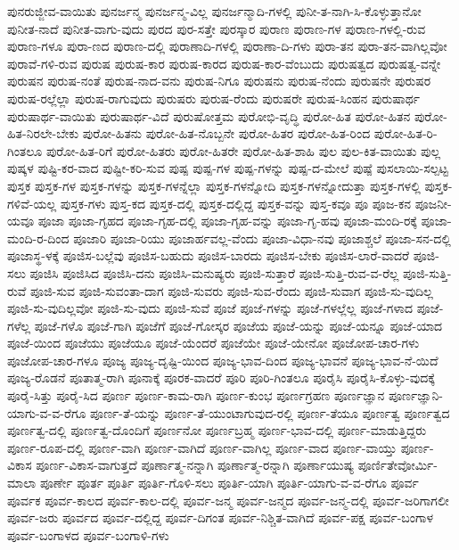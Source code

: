 {ಪುನರುಜ್ಜೀವ-ವಾಯಿತು
ಪುನರ್ಜನ್ಮ
ಪುನರ್ಜನ್ಮ-ವಿಲ್ಲ
ಪುನರ್ಜನ್ಮಾದಿ-ಗಳಲ್ಲಿ
ಪುನೀ-ತ-ನಾಗಿ-ಸಿ-ಕೊಳ್ಳುತ್ತಾನೋ
ಪುನೀತ-ನಾದೆ
ಪುನೀತ-ವಾಗು-ವುದು
ಪುರದ
ಪುರ-ಸತ್ತೇ
ಪುರಸ್ಕಾರ
ಪುರಾಣ
ಪುರಾಣ-ಗಳ
ಪುರಾಣ-ಗಳಲ್ಲಿ-ರುವ
ಪುರಾಣ-ಗಳೂ
ಪುರಾ-ಣದ
ಪುರಾಣ-ದಲ್ಲಿ
ಪುರಾಣಾದಿ-ಗಳಲ್ಲಿ
ಪುರಾಣಾ-ದಿ-ಗಳು
ಪುರಾ-ತನ
ಪುರಾ-ತನ-ವಾಗಿಲ್ಲವೋ
ಪುರಾವೆ-ಗಳಿ-ರುವ
ಪುರುಷ
ಪುರುಷ-ಕಾರ
ಪುರುಷ-ಕಾರದ
ಪುರುಷ-ಕಾರ-ವೆಂಬುದು
ಪುರುಷತ್ವದ
ಪುರುಷತ್ವ-ವನ್ನೇ
ಪುರುಷನ
ಪುರುಷ-ನಂತೆ
ಪುರುಷ-ನಾದ-ವನು
ಪುರುಷ-ನಿಗೂ
ಪುರುಷನು
ಪುರುಷ-ನೆಂದು
ಪುರುಷನೇ
ಪುರುಷರ
ಪುರುಷ-ರಲ್ಲೆಲ್ಲಾ
ಪುರುಷ-ರಾಗುವುದು
ಪುರುಷರು
ಪುರುಷ-ರೆಂದು
ಪುರುಷರೇ
ಪುರುಷ-ಸಿಂಹನ
ಪುರುಷಾರ್ಥ
ಪುರುಷಾರ್ಥ-ವಾಯಿತು
ಪುರುಷಾರ್ಥ-ವಿದೆ
ಪುರುಷೋತ್ತಮ
ಪುರೋಭಿ-ವೃದ್ಧಿ
ಪುರೋ-ಹಿತ
ಪುರೋ-ಹಿತನ
ಪುರೋ-ಹಿತ-ನಿರಲೇ-ಬೇಕು
ಪುರೋ-ಹಿತನು
ಪುರೋ-ಹಿತ-ನೊಬ್ಬನೇ
ಪುರೋ-ಹಿತರ
ಪುರೋ-ಹಿತ-ರಿಂದ
ಪುರೋ-ಹಿತ-ರಿ-ಗಿಂತಲೂ
ಪುರೋ-ಹಿತ-ರಿಗೆ
ಪುರೋ-ಹಿತರು
ಪುರೋ-ಹಿತರೇ
ಪುರೋ-ಹಿತ-ಶಾಹಿ
ಪುಲ
ಪುಲ-ಕಿತ-ವಾಯಿತು
ಪುಲ್ಲ
ಪುಷ್ಕಳ
ಪುಷ್ಟಿ-ಕರ-ವಾದ
ಪುಷ್ಟೀ-ಕರಿ-ಸುವ
ಪುಷ್ಪ
ಪುಷ್ಪ-ಗಳ
ಪುಷ್ಪ-ಗಳನ್ನು
ಪುಷ್ಪ-ದ-ಮೇಲೆ
ಪುಷ್ಪೆ
ಪುಸಲಾಯಿ-ಸಲ್ಪಟ್ಟ
ಪುಸ್ತಕ
ಪುಸ್ತಕ-ಗಳ
ಪುಸ್ತಕ-ಗಳನ್ನು
ಪುಸ್ತಕ-ಗಳನ್ನೆಲ್ಲಾ
ಪುಸ್ತಕ-ಗಳನ್ನೋದಿ
ಪುಸ್ತಕ-ಗಳನ್ನೋದುತ್ತಾ
ಪುಸ್ತಕ-ಗಳಲ್ಲಿ
ಪುಸ್ತಕ-ಗಳಿವೆ-ಯಲ್ಲ
ಪುಸ್ತಕ-ಗಳು
ಪುಸ್ತ-ಕದ
ಪುಸ್ತಕ-ದಲ್ಲಿ
ಪುಸ್ತಕ-ದಲ್ಲಿದ್ದ
ಪುಸ್ತಕ-ವನ್ನು
ಪುಸ್ತ-ಕವೂ
ಪೂ
ಪೂಜ-ಕನ
ಪೂಜನೀ-ಯವೂ
ಪೂಜಾ
ಪೂಜಾ-ಗೃಹದ
ಪೂಜಾ-ಗೃಹ-ದಲ್ಲಿ
ಪೂಜಾ-ಗೃಹ-ವನ್ನು
ಪೂಜಾ-ಗೃ-ಹವು
ಪೂಜಾ-ಮಂದಿ-ರಕ್ಕೆ
ಪೂಜಾ-ಮಂದಿ-ರ-ದಿಂದ
ಪೂಜಾರಿ
ಪೂಜಾ-ರಿಯು
ಪೂಜಾರ್ಹವಲ್ಲ-ವೆಂದು
ಪೂಜಾ-ವಿಧಾ-ನವು
ಪೂಜಾಶ್ಚಲೆ
ಪೂಜಾ-ಸನ-ದಲ್ಲಿ
ಪೂಜಾಸ್ಥ-ಳಕ್ಕೆ
ಪೂಜಿಸ-ಬಲ್ಲೆವು
ಪೂಜಿಸ-ಬಹುದು
ಪೂಜಿಸ-ಬಾರದು
ಪೂಜಿಸ-ಬೇಕು
ಪೂಜಿಸ-ಲಾರೆ-ವಾದರೆ
ಪೂಜಿ-ಸಲು
ಪೂಜಿಸಿ
ಪೂಜಿಸಿದ
ಪೂಜಿಸಿ-ದನು
ಪೂಜಿಸಿ-ಮನುಷ್ಯರು
ಪೂಜಿ-ಸುತ್ತಾರೆ
ಪೂಜಿ-ಸುತ್ತಿ-ರುವ-ವ-ರೆಲ್ಲ
ಪೂಜಿ-ಸುತ್ತಿ-ರುವೆ
ಪೂಜಿ-ಸುವ
ಪೂಜಿ-ಸುವಂತಾ-ದಾಗ
ಪೂಜಿ-ಸುವರು
ಪೂಜಿ-ಸುವ-ರೆಂದು
ಪೂಜಿ-ಸುವಾಗ
ಪೂಜಿ-ಸು-ವುದಿಲ್ಲ
ಪೂಜಿ-ಸು-ವುದಿಲ್ಲವೋ
ಪೂಜಿ-ಸು-ವುದು
ಪೂಜಿ-ಸುವೆ
ಪೂಜೆ
ಪೂಜೆ-ಗಳನ್ನು
ಪೂಜೆ-ಗಳಲ್ಲೆಲ್ಲ
ಪೂಜೆ-ಗಳಾದ
ಪೂಜೆ-ಗಳೆಲ್ಲ
ಪೂಜೆ-ಗಳೊ
ಪೂಜೆ-ಗಾಗಿ
ಪೂಜೆಗೆ
ಪೂಜೆ-ಗೋಸ್ಕರ
ಪೂಜೆಯ
ಪೂಜೆ-ಯನ್ನು
ಪೂಜೆ-ಯನ್ನೂ
ಪೂಜೆ-ಯಾದ
ಪೂಜೆ-ಯಿಂದ
ಪೂಜೆಯು
ಪೂಜೆಯೂ
ಪೂಜೆ-ಯೆಂದರೆ
ಪೂಜೆಯೇ
ಪೂಜೆ-ಯೇನೋ
ಪೂಜೋಪ-ಚಾರ-ಗಳು
ಪೂಜೋಪ-ಚಾರ-ಗಳೂ
ಪೂಜ್ಯ
ಪೂಜ್ಯ-ದೃಷ್ಟಿ-ಯಿಂದ
ಪೂಜ್ಯ-ಭಾವ-ದಿಂದ
ಪೂಜ್ಯ-ಭಾವನೆ
ಪೂಜ್ಯ-ಭಾವ-ನೆ-ಯಿದೆ
ಪೂಜ್ಯ-ರೊಡನೆ
ಪೂತಾತ್ಮ-ರಾಗಿ
ಪೂನಾಕ್ಕೆ
ಪೂರಕ-ವಾದರೆ
ಪೂರಿ
ಪೂರಿ-ಗಿಂತಲೂ
ಪೂರೈಸಿ
ಪೂರೈಸಿ-ಕೊಳ್ಳು-ವುದಕ್ಕೆ
ಪೂರೈ-ಸಿತ್ತು
ಪೂರೈ-ಸಿದ
ಪೂರ್ಣ
ಪೂರ್ಣ-ಕಾಮ-ರಾಗಿ
ಪೂರ್ಣ-ಕುಂಭ
ಪೂರ್ಣಗ್ರಹಣ
ಪೂರ್ಣಜ್ಞಾನ
ಪೂರ್ಣಜ್ಞಾನಿ-ಯಾಗು-ವ-ವ-ರೆಗೂ
ಪೂರ್ಣ-ತೆ-ಯನ್ನು
ಪೂರ್ಣ-ತೆ-ಯುಂಟಾಗುವುದ-ರಲ್ಲಿ
ಪೂರ್ಣ-ತೆಯೂ
ಪೂರ್ಣತ್ವ
ಪೂರ್ಣತ್ವದ
ಪೂರ್ಣತ್ವ-ದಲ್ಲಿ
ಪೂರ್ಣತ್ವ-ದೊಂದಿಗೆ
ಪೂರ್ಣನೋ
ಪೂರ್ಣಬ್ರಹ್ಮ
ಪೂರ್ಣ-ಭಾವ-ದಲ್ಲಿ
ಪೂರ್ಣ-ಮಾಡುತ್ತಿದ್ದರು
ಪೂರ್ಣ-ರೂಪ-ದಲ್ಲಿ
ಪೂರ್ಣ-ವಾಗಿ
ಪೂರ್ಣ-ವಾಗಿದೆ
ಪೂರ್ಣ-ವಾಗಿಲ್ಲ
ಪೂರ್ಣ-ವಾದ
ಪೂರ್ಣ-ವಾಯ್ತು
ಪೂರ್ಣ-ವಿಕಾಸ
ಪೂರ್ಣ-ವಿಕಾಸ-ವಾಗುತ್ತದೆ
ಪೂರ್ಣಾತ್ಮ-ನನ್ನಾಗಿ
ಪೂರ್ಣಾತ್ಮ-ರನ್ನಾಗಿ
ಪೂರ್ಣಾಯುಷ್ಯ
ಪೂರ್ಣಿತೇವೋರ್ಮಿ-ಮಾಲಾ
ಪೂರ್ಣೇ
ಪೂರ್ತ
ಪೂರ್ತಿ
ಪೂರ್ತಿ-ಗೊಳಿ-ಸಲು
ಪೂರ್ತಿ-ಯಾಗಿ
ಪೂರ್ತಿ-ಯಾಗು-ವ-ವ-ರೆಗೂ
ಪೂರ್ವ
ಪೂರ್ವಕ
ಪೂರ್ವ-ಕಾಲದ
ಪೂರ್ವ-ಕಾಲ-ದಲ್ಲಿ
ಪೂರ್ವ-ಜನ್ಮ
ಪೂರ್ವ-ಜನ್ಮದ
ಪೂರ್ವ-ಜನ್ಮ-ದಲ್ಲಿ
ಪೂರ್ವ-ಜರಿಗಾಗಲೀ
ಪೂರ್ವ-ಜರು
ಪೂರ್ವದ
ಪೂರ್ವ-ದಲ್ಲಿದ್ದ
ಪೂರ್ವ-ದಿಗಂತ
ಪೂರ್ವ-ನಿಶ್ಚಿತ-ವಾಗಿದೆ
ಪೂರ್ವ-ಪಕ್ಷ
ಪೂರ್ವ-ಬಂಗಾಳ
ಪೂರ್ವ-ಬಂಗಾಳದ
ಪೂರ್ವ-ಬಂಗಾಳಿ-ಗಳು
}
